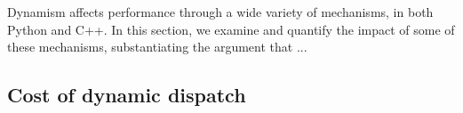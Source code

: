 Dynamism affects performance through a wide variety of mechanisms, in both Python and C++.
In this section, we examine and quantify the impact of some of these mechanisms, substantiating the argument that ...

\subsection{Cost of dynamic dispatch}




